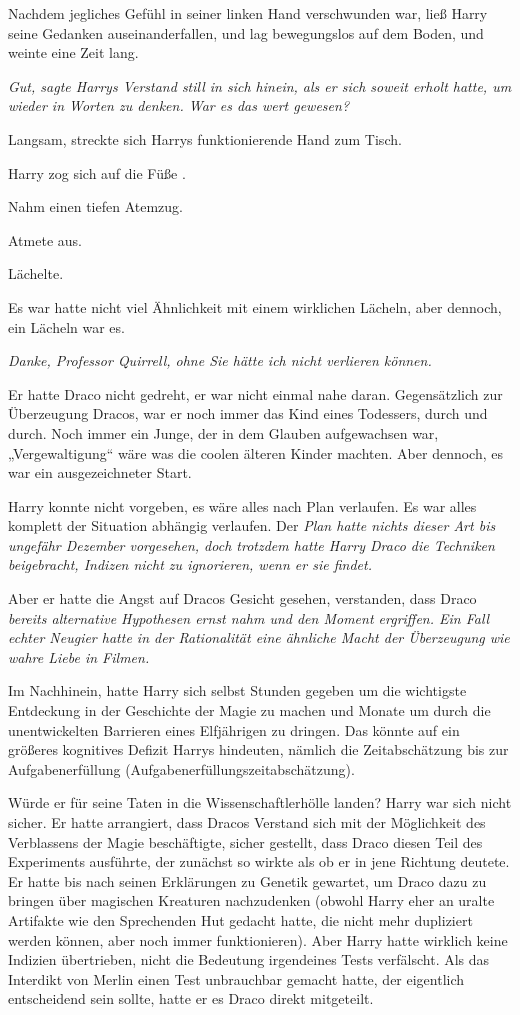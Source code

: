 {Nachdem jegliches Gefühl in seiner linken Hand verschwunden war, ließ Harry seine Gedanken auseinanderfallen, und lag bewegungslos auf dem Boden, und weinte eine Zeit lang.

\emph{Gut, sagte Harrys Verstand still in sich hinein, als er sich soweit erholt hatte, um wieder in Worten zu denken. \emph{War es das wert gewesen?}}

Langsam, streckte sich Harrys funktionierende Hand zum Tisch.

Harry zog sich auf die Füße .

Nahm einen tiefen Atemzug.

Atmete aus.

Lächelte.

Es war hatte nicht viel Ähnlichkeit mit einem wirklichen Lächeln, aber dennoch, ein Lächeln war es.

\emph{Danke, Professor Quirrell, ohne Sie hätte ich nicht verlieren können.}

Er hatte Draco nicht gedreht, er war nicht einmal nahe daran. Gegensätzlich zur Überzeugung Dracos, war er noch immer das Kind eines Todessers, durch und durch. Noch immer ein Junge, der in dem Glauben aufgewachsen war, „Vergewaltigung“ wäre was die coolen älteren Kinder machten. Aber dennoch, es war ein ausgezeichneter Start.

Harry konnte nicht vorgeben, es wäre alles nach Plan verlaufen. Es war alles komplett der Situation abhängig verlaufen. Der \emph{Plan hatte nichts dieser Art bis ungefähr Dezember vorgesehen, doch trotzdem hatte Harry Draco die Techniken beigebracht, Indizen nicht zu ignorieren, wenn er sie findet.}

Aber er hatte die Angst auf Dracos Gesicht gesehen, verstanden, dass Draco \emph{bereits alternative Hypothesen ernst nahm und den Moment ergriffen. Ein Fall echter Neugier hatte in der Rationalität eine ähnliche Macht der Überzeugung wie wahre Liebe in Filmen.}

Im Nachhinein, hatte Harry sich selbst Stunden gegeben um die wichtigste Entdeckung in der Geschichte der Magie zu machen und Monate um durch die unentwickelten Barrieren eines Elfjährigen zu dringen. Das könnte auf ein größeres kognitives Defizit Harrys hindeuten, nämlich die Zeitabschätzung bis zur Aufgabenerfüllung (Aufgabenerfüllungszeitabschätzung).

Würde er für seine Taten in die Wissenschaftlerhölle landen? Harry war sich nicht sicher. Er hatte arrangiert, dass Dracos Verstand sich mit der Möglichkeit des Verblassens der Magie beschäftigte, sicher gestellt, dass Draco diesen Teil des Experiments ausführte, der zunächst so wirkte als ob er in jene Richtung deutete. Er hatte bis nach seinen Erklärungen zu Genetik gewartet, um Draco dazu zu bringen über magischen Kreaturen nachzudenken (obwohl Harry eher an uralte Artifakte wie den Sprechenden Hut gedacht hatte, die nicht mehr dupliziert werden können, aber noch immer funktionieren). Aber Harry hatte wirklich keine Indizien übertrieben, nicht die Bedeutung irgendeines Tests verfälscht. Als das Interdikt von Merlin einen Test unbrauchbar gemacht hatte, der eigentlich entscheidend sein sollte, hatte er es Draco direkt mitgeteilt.

}
